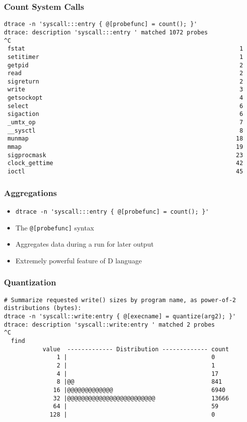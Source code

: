 \documentclass[pdftex]{beamer}
\begin{document}
\begin{frame}[fragile]
  \frametitle{Count System Calls}
\begin{lstlisting}
dtrace -n 'syscall:::entry { @[probefunc] = count(); }'
dtrace: description 'syscall:::entry ' matched 1072 probes
^C
 fstat                                                             1
 setitimer                                                         1
 getpid                                                            2
 read                                                              2
 sigreturn                                                         2
 write                                                             3
 getsockopt                                                        4
 select                                                            6
 sigaction                                                         6
 _umtx_op                                                          7
 __sysctl                                                          8
 munmap                                                           18
 mmap                                                             19
 sigprocmask                                                      23
 clock_gettime                                                    42
 ioctl                                                            45
\end{lstlisting}
\end{frame}

\begin{frame}[fragile]
  \frametitle{Aggregations}
  \begin{itemize}
  \item \verb+dtrace -n 'syscall:::entry { @[probefunc] = count(); }'+
  \item The \verb+@[probefunc]+ syntax
  \item Aggregates data during a run for later output
  \item Extremely powerful feature of D language
  \end{itemize}
\end{frame}

\begin{frame}[fragile]
  \frametitle{Quantization}
\begin{lstlisting}
# Summarize requested write() sizes by program name, as power-of-2 distributions (bytes):
dtrace -n 'syscall::write:entry { @[execname] = quantize(arg2); }'
dtrace: description 'syscall::write:entry ' matched 2 probes
^C
  find                                              
           value  ------------- Distribution ------------- count    
               1 |                                         0        
               2 |                                         1        
               4 |                                         17       
               8 |@@                                       841      
              16 |@@@@@@@@@@@@@                            6940     
              32 |@@@@@@@@@@@@@@@@@@@@@@@@@                13666    
              64 |                                         59       
             128 |                                         0        
\end{lstlisting}
\end{frame}
\end{document}

